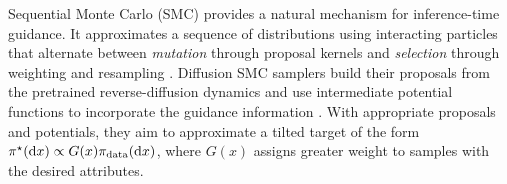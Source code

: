 \documentclass[11pt]{article}
\theoremstyle{plain}
\theoremstyle{definition}
\theoremstyle{remark}
\begin{document}
Sequential Monte Carlo (SMC) provides a natural mechanism for inference-time guidance. It approximates a sequence of distributions using interacting particles that alternate between \emph{mutation} through proposal kernels and \emph{selection} through weighting and resampling \citep{doucet2001sequential,delmoral2004feynman,del2006sequential,chopin2020introduction}. Diffusion SMC samplers build their proposals from the pretrained reverse-diffusion dynamics and use intermediate potential functions to incorporate the guidance information \citep{trippe2023diffusion,wu2023practical,cardoso2024monte,dou2024diffusion,singhal2025general,nazemi2024particle}. With appropriate proposals and potentials, they aim to approximate a tilted target of the form \(\pi^\star(\mathrm{d}x)\propto G(x)\pi_{\rm data}(\mathrm{d}x)\), where \(G(x)\) assigns greater weight to samples with the desired attributes.


\end{document}
